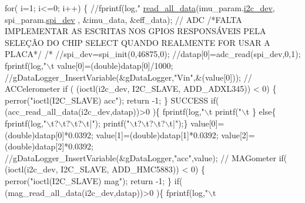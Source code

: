 \begin{DoxyCode}
  \textcolor{keywordflow}{for}( i=1; i<=0; i++)
  \{  
      \textcolor{comment}{//fprintf(log,"    %
      \hyperlink{communication_01_07C_xC3_xB3pia_01em_01conflito_01de_01Andr_xC3_xA9_01Carvalho_012013-04-26_08_8c_a577b5eb591b20e011d86397f2c6f3a53}{read\_all\_data}(imu\_param.\hyperlink{structIMU__PARAM__STRUCT_a8a870f383fc9ba0b682fdc9b8c0d2734}{i2c\_dev}, spi\_param.\hyperlink{structSPI__PARAM__STRUCT_abe385c44333d268d17cf648c8e371cad}{spi\_dev}
      , &imu\_data, &eff\_data);
  \textcolor{comment}{// ADC}
\textcolor{comment}{/*FALTA IMPLEMENTAR AS ESCRITAS NOS GPIOS RESPONSÁVEIS PELA SELEÇÃO DO CHIP
       SELECT QUANDO REALMENTE FOR USAR A PLACA*/}
\textcolor{comment}{/*      //spi\_dev=spi\_init(0,46875,0);}
\textcolor{comment}{      //datap[0]=adc\_read(spi\_dev,0,1);}
\textcolor{comment}{      fprintf(log,"\(\backslash\)t%
\textcolor{comment}{      value[0]=(double)datap[0]/1000;}
\textcolor{comment}{      //gDataLogger\_InsertVariable(&gDataLogger,"Vin",&(value[0]));}
\textcolor{comment}{  // ACCelerometer}
\textcolor{comment}{      if ( (ioctl(i2c\_dev, I2C\_SLAVE, ADD\_ADXL345)) < 0) \{}
\textcolor{comment}{        perror("ioctl(I2C\_SLAVE) acc");}
\textcolor{comment}{        return -1;}
\textcolor{comment}{      \}  SUCCESS}
\textcolor{comment}{      if( (acc\_read\_all\_data(i2c\_dev,datap))>0 )\{}
\textcolor{comment}{        fprintf(log,"\(\backslash\)t%
       printf("\(\backslash\)t%
\textcolor{comment}{        }
\textcolor{comment}{      \}}
\textcolor{comment}{      else\{}
\textcolor{comment}{        fprintf(log,"\(\backslash\)t?\(\backslash\)t?\(\backslash\)t?\(\backslash\)t|"); printf("\(\backslash\)t?\(\backslash\)t?\(\backslash\)t?\(\backslash\)t|");\}}
\textcolor{comment}{      value[0]=(double)datap[0]*0.0392;}
\textcolor{comment}{      value[1]=(double)datap[1]*0.0392;}
\textcolor{comment}{      value[2]=(double)datap[2]*0.0392;}
\textcolor{comment}{      //gDataLogger\_InsertVariable(&gDataLogger,"acc",value);}
\textcolor{comment}{  // MAGometer    }
\textcolor{comment}{      if( (ioctl(i2c\_dev, I2C\_SLAVE, ADD\_HMC5883)) < 0) \{}
\textcolor{comment}{        perror("ioctl(I2C\_SLAVE) mag");}
\textcolor{comment}{        return -1;}
\textcolor{comment}{      \} }
\textcolor{comment}{      if( (mag\_read\_all\_data(i2c\_dev,datap))>0 )\{}
\textcolor{comment}{        fprintf(log,"\(\backslash\)t%
}}}}
\end{DoxyCode}
